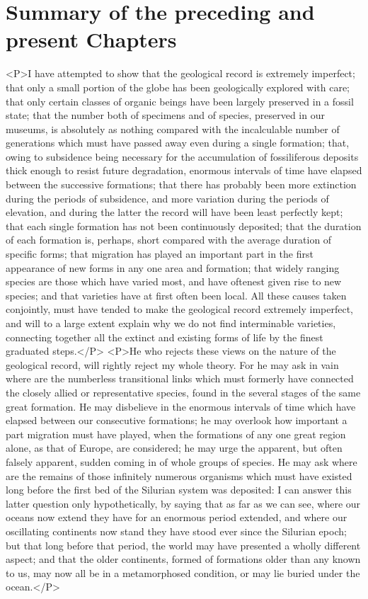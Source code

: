 \section{Summary of the preceding and present Chapters}
<P>I have attempted to show that the geological record is extremely imperfect; that only a small portion of the globe has been geologically explored with care; that only certain classes of organic beings have been largely preserved in a fossil state; that the number both of specimens and of species, preserved in our museums, is absolutely as nothing compared with the incalculable number of generations which must have passed away even during a single formation; that, owing to subsidence being necessary for the accumulation of fossiliferous deposits thick enough to resist future degradation, enormous intervals of time have elapsed between the successive formations; that there has probably been more extinction during the periods of subsidence, and more variation during the periods of elevation, and during the latter the record will have been least perfectly kept; that each single formation has not been continuously deposited; that the duration of each formation is, perhaps, short compared with the average duration of specific forms; that migration has played an important part in the first appearance of new forms in any one area and formation; that widely ranging species are those which have varied most, and have oftenest given rise to new species; and that varieties have at first often been local. All these causes taken conjointly, must have tended to make the geological record extremely imperfect, and will to a large extent explain why we do not find interminable varieties, connecting together all the extinct and existing forms of life by the finest graduated steps.</P>
<P>He who rejects these views on the nature of the geological record, will rightly reject my whole theory. For he may ask in vain where are the numberless transitional links which must formerly have connected the closely allied or representative species, found in the several stages of the same great formation. He may disbelieve in the enormous intervals of time which have elapsed between our consecutive formations; he may overlook how important a part migration must have played, when the formations of any one great region alone, as that of Europe, are considered; he may urge the apparent, but often falsely apparent, sudden coming in of whole groups of species. He may ask where are the remains of those infinitely numerous organisms which must have existed long before the first bed of the Silurian system was deposited: I can answer this latter question only hypothetically, by saying that as far as we can see, where our oceans now extend they have for an enormous period extended, and where our oscillating continents now stand they have stood ever since the Silurian epoch; but that long before that period, the world may have presented a wholly different aspect; and that the older continents, formed of formations older than any known to us, may now all be in a metamorphosed condition, or may lie buried under the ocean.</P>
